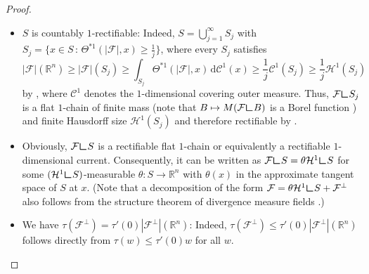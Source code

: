 \documentclass[10pt,a4paper,oneside,final]{article}
\newcommand{\R}{{\mathbb{R}}}
\newcommand{\de}{{\mathrm{d}}}
\newcommand{\hdone}{\mathcal{H}^1}
\newcommand{\restr}{{\mbox{\LARGE$\llcorner$}}}
\newcommand{\mass}[1]{M(#1)}
\newcommand{\flux}{{\mathcal{F}}}
\numberwithin{equation}{section}
\theoremstyle{plain}
\theoremstyle{definition}
\theoremstyle{remark}
\begin{document}
\begin{proof}
\begin{itemize}
\item $S$ is countably $1$-rectifiable: Indeed, $S=\bigcup_{j=1}^\infty S_j$ with $S_j=\{x\in S\,:\,\Theta^{*1}(|\flux|,x)\geq\frac1j\}$,
where every $S_j$ satisfies
$$|\flux|(\R^n)\geq|\flux|(S_j)\geq\int_{S_j}\Theta^{*1}(|\flux|,x)\,\de\mathcal C^1(x)\geq\frac1j\mathcal C^1(S_j)\geq\frac1j\hdone(S_j)$$ by \cite[(3.3)(a) \& (1.3)]{Ed94},
where $\mathcal C^1$ denotes the $1$-dimensional covering outer measure.
Thus, $\flux\restr S_j$ is a flat $1$-chain of finite mass (note that $B\mapsto\mass{\flux\restr B}$ is a Borel function \cite[Sec.\,4]{Fl66}) and finite Hausdorff size $\hdone(S_j)$
and therefore rectifiable by \cite[Thm.\,4.1]{Wh99b}.
\item Obviously, $\flux\restr S$ is a rectifiable flat $1$-chain or equivalently a rectifiable $1$-dimensional current.
Consequently, it can be written as $\flux\restr S=\theta\hdone\restr S$ for some $(\hdone\restr S)$-measurable $\theta:S\to\R^n$ with $\theta(x)$ in the approximate tangent space of $S$ at $x$.
(Note that a decomposition of the form $\flux=\theta\hdone\restr S+\flux^\perp$ also follows from the structure theorem of divergence measure fields \cite[Thm.\,5.5]{Si07}.)
\item We have $\tau(\flux^\perp)=\tau'(0)|\flux^\perp|(\R^n)$: Indeed, $\tau(\flux^\perp)\leq\tau'(0)|\flux^\perp|(\R^n)$ follows directly from $\tau(w)\leq\tau'(0)w$ for all $w$.

\end{itemize}
\end{proof}
\end{document}
